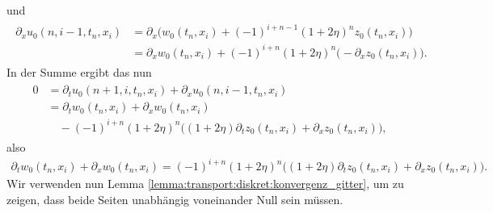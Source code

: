 und
\begin{align}
\begin{split}
\partial_x u_0(n, i-1, t_n, x_i) &= \partial_x \bigl( w_0(t_n, x_i) + (-1)^{i+n-1} (1 + 2\eta)^n z_0(t_n, x_i) \bigr)\\
&= \partial_x w_0(t_n, x_i) + (-1)^{i+n} (1 + 2\eta)^n \bigl( - \partial_x z_0(t_n, x_i) \bigr).
\end{split}
\end{align}
In der Summe ergibt das nun
\begin{align}\label{alt:summe1}
\begin{split}
0 &= \partial_t u_0(n+1, i, t_n, x_i) + \partial_x u_0(n, i-1, t_n, x_i)\\
&= \partial_t w_0(t_n, x_i) + \partial_x w_0(t_n, x_i)\\
&\quad - (-1)^{i+n} (1 + 2\eta)^n \bigl( (1 + 2 \eta) \partial_t z_0(t_n, x_i) + \partial_x z_0(t_n, x_i) \bigr),
\end{split}
\end{align}
also
\begin{align}\label{eq:apx:beidenull1}
\partial_t w_0(t_n, x_i) + \partial_x w_0(t_n, x_i) = (-1)^{i+n} (1 + 2\eta)^n \bigl( (1 + 2 \eta) \partial_t z_0(t_n, x_i) + \partial_x z_0(t_n, x_i) \bigr).
\end{align}
Wir verwenden nun Lemma \ref{lemma:transport:diskret:konvergenz_gitter}, um zu zeigen, dass beide Seiten unabhängig voneinander Null sein müssen.
\\

